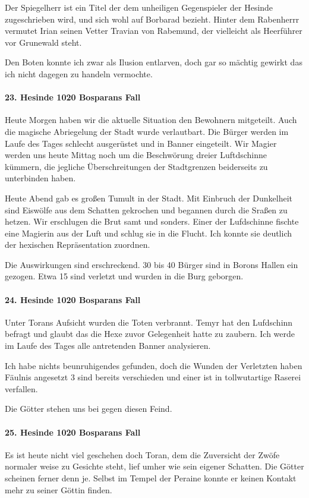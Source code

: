 Der Spiegelherr ist ein Titel der dem unheiligen Gegenspieler der Hesinde zugeschrieben wird, und sich wohl auf Borbarad bezieht. Hinter dem Rabenherrr vermutet Irian seinen Vetter Travian von Rabemund, der vielleicht als Heerführer vor Grunewald steht.

Den Boten konnte ich zwar als Ilusion entlarven, doch gar so mächtig gewirkt das ich nicht dagegen zu handeln vermochte.

\paragraph{23. Hesinde 1020 Bosparans Fall}
Heute Morgen haben wir die aktuelle Situation den Bewohnern mitgeteilt. Auch die magische Abriegelung der Stadt wurde verlautbart. Die Bürger werden im Laufe des Tages schlecht ausgerüstet und in Banner eingeteilt. Wir Magier werden uns heute Mittag noch um die Beschwörung dreier Luftdschinne kümmern, die jegliche Überschreitungen der Stadtgrenzen beiderseits zu unterbinden haben.

Heute Abend gab es großen Tumult in der Stadt. Mit Einbruch der Dunkelheit sind Eiswölfe aus dem Schatten gekrochen und begannen durch die Sraßen zu hetzen. Wir erschlugen die Brut samt und sonders. Einer der Lufdschinne fischte eine Magierin aus der Luft und schlug sie in die Flucht. Ich konnte sie deutlich der hexischen Repräsentation zuordnen.

Die Auswirkungen sind erschreckend. 30 bis 40 Bürger sind in Borons Hallen ein gezogen. Etwa 15 sind verletzt und wurden in die Burg geborgen.

\paragraph{24. Hesinde 1020 Bosparans Fall}
Unter Torans Aufsicht wurden die Toten verbrannt. Temyr hat den Lufdschinn befragt und glaubt das die Hexe zuvor Gelegenheit hatte zu zaubern. Ich werde im Laufe des Tages alle antretenden Banner analysieren.

Ich habe nichts beunruhigendes gefunden, doch die Wunden der Verletzten haben Fäulnis angesetzt 3 sind bereits verschieden und einer ist in tollwutartige Raserei verfallen.

Die Götter stehen uns bei gegen diesen Feind.

\paragraph{25. Hesinde 1020 Bosparans Fall}
Es ist heute nicht viel geschehen doch Toran, dem die Zuversicht der Zwöfe normaler weise zu Gesichte steht, lief umher wie sein eigener Schatten. Die Götter scheinen ferner denn je. Selbst im Tempel der Peraine konnte er keinen Kontakt mehr zu seiner Göttin finden.

